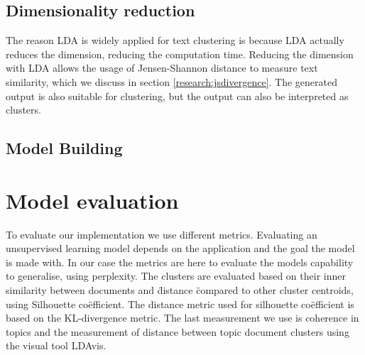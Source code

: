 \subsection{Dimensionality reduction} \label{methodology:dimreduction}
The reason LDA is widely applied for text clustering is because LDA actually reduces the dimension, reducing the computation time. Reducing the dimension with LDA allows the usage of Jensen-Shannon distance to measure text similarity, which we discuss in section \ref{research:jsdivergence}. The generated output is also suitable for clustering, but the output can also be interpreted as clusters.


\begin{comment}
\section{Syslog}\label{methodology:syslog}
Syslogs are textual messages \cite{Stearley2004TowardsSyslogs} which contain the messages provided by the systems.
\section{Challenges}
\subsection{Natural Language Processing}
\subsection{Semantics}
\subsection{Sentiment analysis}
\subsection{Extract, Transform, Load}
\end{comment}

\subsection{Model Building}

\section{Model evaluation}\label{methodology:evaluation measures}
To evaluate our implementation we use different metrics. Evaluating an unsupervised learning model depends on the application and the goal the model is made with. In our case the metrics are here to evaluate the models capability to generalise, using perplexity. The clusters are evaluated based on their inner similarity between documents and \" distance \" compared to other cluster centroids, using Silhouette co\"efficient. The distance metric used for silhouette co\"efficient is based on the KL-divergence metric. The last measurement we use is coherence in topics and the measurement of distance between topic document clusters using the visual tool LDAvis.

